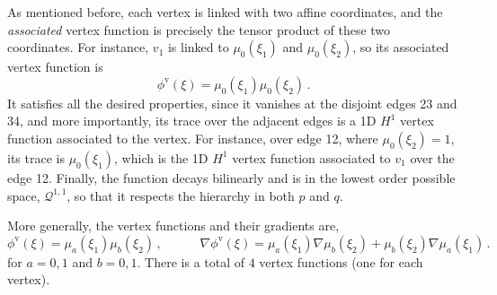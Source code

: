 As mentioned before, each vertex is linked with two affine coordinates, and the \textit{associated} vertex function is precisely the tensor product of these two coordinates.
For instance, $v_1$ is linked to $\mu_0(\xi_1)$ and $\mu_0(\xi_2)$, so its associated vertex function is  
\begin{equation*}
	\phi^\mathrm{v}(\xi)=\mu_0(\xi_1)\mu_0(\xi_2)\,.
\end{equation*}
It satisfies all the desired properties, since it vanishes at the disjoint edges 23 and 34, and more importantly, its trace over the adjacent edges is a 1D $H^1$ vertex function associated to the vertex.
For instance, over edge 12, where $\mu_0(\xi_2)=1$, its trace is $\mu_0(\xi_1)$, which is the 1D $H^1$ vertex function associated to $v_1$ over the edge 12.
Finally, the function decays bilinearly and is in the lowest order possible space, $\mathcal{Q}^{1,1}$, so that it respects the hierarchy in both $p$ and $q$.

More generally, the vertex functions and their gradients are,
\begin{equation}
    \phi^\mathrm{v}(\xi)=\mu_a(\xi_1)\mu_b(\xi_2)\,,\quad\qquad
    \nabla\phi^\mathrm{v}(\xi)=\mu_a(\xi_1)\nabla\mu_b(\xi_2)+\mu_b(\xi_2)\nabla\mu_a(\xi_1)\,.\label{eq:H1vertexquad}
\end{equation}
for $a=0,1$ and $b=0,1$.
%    
There is a total of $4$ vertex functions (one for each vertex). %



